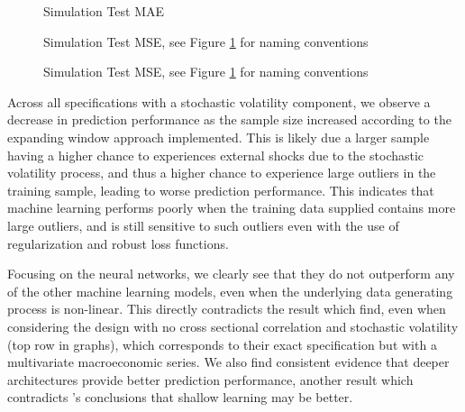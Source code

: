 \documentclass{article}
\begin{document}
\begin{figure}[!htb]
	\centering
	\caption{Simulation Test MAE}
	\label{fig:simulation_loss_metrics}
\end{figure}

\begin{figure}[!htb]
	\centering
	\caption{Simulation Test MSE, see Figure \ref{fig:simulation_loss_metrics} for naming conventions}
\end{figure}

\begin{figure}[!htb]
	\centering
	\caption{Simulation Test MSE, see Figure \ref{fig:simulation_loss_metrics} for naming conventions}
\end{figure}

Across all specifications with a stochastic volatility component, we observe a decrease in prediction performance as the sample size increased according to the expanding window approach implemented. This is likely due a larger sample having a higher chance to experiences external shocks due to the stochastic volatility process, and thus a higher chance to experience large outliers in the training sample, leading to worse prediction performance. This indicates that machine learning performs poorly when the training data supplied contains more large outliers, and is still sensitive to such outliers even with the use of regularization and robust loss functions.

Focusing on the neural networks, we clearly see that they do not outperform any of the other machine learning models, even when the underlying data generating process is non-linear. This directly contradicts the result which \cite{gu_empirical_2018} find, even when considering the design with no cross sectional correlation and stochastic volatility (top row in graphs), which corresponds to their exact specification but with a multivariate macroeconomic series. We also find consistent evidence that deeper architectures provide better prediction performance, another result which contradicts \cite{gu_empirical_2018}'s conclusions that shallow learning may be better.
\end{document}
